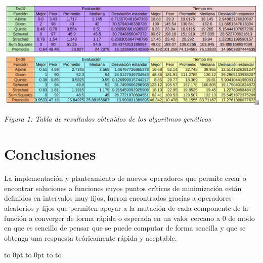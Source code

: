\documentclass[10pt]{article}
\def\fillandplacepagenumber{%
 \par\pagestyle{empty}%
 \vbox to 0pt{\vss}\vfill
 \vbox to 0pt{\baselineskip0pt
   \hbox to\linewidth{\hss}%
   \baselineskip\footskip
   \hbox to\linewidth{%
     \hfil\thepage\hfil}\vss}}
\begin{document}
\begin{landscape}
  \includegraphics[scale=0.5]{imgs/tablas.png}
  \begin{center}
    \textit{Figura 1: Tabla de resultados obtenidos de los algoritmos genéticos}
  \end{center}
  \section{Conclusiones}
  La implementación y planteamiento de nuevos operadores que permite crear o encontrar soluciones a funciones cuyos puntos críticos de minimización están definidos en intervalos muy fijos, fueron encontrados gracias a operadores aleatorios y fijos que permiten apoyar a la mutación de cada componente de la función a converger de forma rápida o esperada en un valor cercano a $0$ de modo en que es sencillo de pensar que se puede computar de forma sencilla y que se obtenga una respuesta teóricamente rápida y aceptable.
  \fillandplacepagenumber

\end{landscape}
\end{document}
